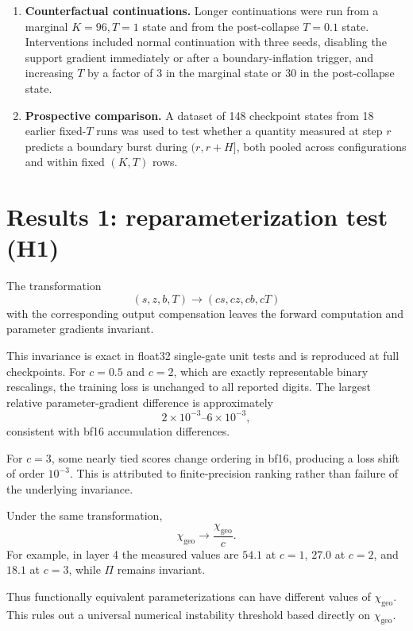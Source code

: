 \documentclass[11pt,a4paper]{article}
\newcommand{\chigeo}{\chi_{\mathrm{geo}}}
\newcommand{\Pisurr}{\Pi}
\begin{document}
\begin{enumerate}[leftmargin=1.6em]
\item \textbf{Counterfactual continuations.} Longer continuations were run from a marginal \(K=96,T=1\) state and from the post-collapse \(T=0.1\) state. Interventions included normal continuation with three seeds, disabling the support gradient immediately or after a boundary-inflation trigger, and increasing \(T\) by a factor of 3 in the marginal state or 30 in the post-collapse state.

\item \textbf{Prospective comparison.} A dataset of 148 checkpoint states from 18 earlier fixed-\(T\) runs was used to test whether a quantity measured at step \(r\) predicts a boundary burst during \((r,r+H]\), both pooled across configurations and within fixed \((K,T)\) rows.
\end{enumerate}

\section{Results 1: reparameterization test (H1)}

The transformation
\[
(s,z,b,T)\to(cs,cz,cb,cT)
\]
with the corresponding output compensation leaves the forward computation and parameter gradients invariant.

This invariance is exact in float32 single-gate unit tests and is reproduced at full checkpoints. For \(c=0.5\) and \(c=2\), which are exactly representable binary rescalings, the training loss is unchanged to all reported digits. The largest relative parameter-gradient difference is approximately
\[
2\times10^{-3}\text{--}6\times10^{-3},
\]
consistent with bf16 accumulation differences.

For \(c=3\), some nearly tied scores change ordering in bf16, producing a loss shift of order \(10^{-3}\). This is attributed to finite-precision ranking rather than failure of the underlying invariance.

Under the same transformation,
\[
\chigeo\to\frac{\chigeo}{c}.
\]
For example, in layer 4 the measured values are \(54.1\) at \(c=1\), \(27.0\) at \(c=2\), and \(18.1\) at \(c=3\), while \(\Pisurr\) remains invariant.

Thus functionally equivalent parameterizations can have different values of \(\chigeo\). This rules out a universal numerical instability threshold based directly on \(\chigeo\).
\end{document}
